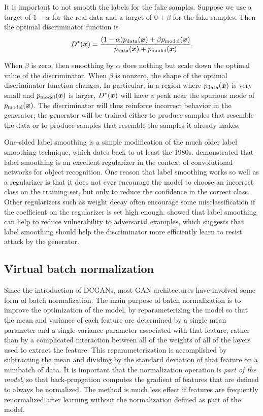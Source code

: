 It is important to not smooth the labels for the fake samples.
Suppose we use a target of $1-\alpha$ for the real data and a target of $0+\beta$
for the fake samples.
Then the optimal discriminator function is
\[ D^*({\bm{x}}) = \frac{(1-\alpha) p_{\rm{data}}({\bm{x}}) + \beta p_{\rm{model}}({\bm{x}})} { p_{\rm{data}}({\bm{x}}) + p_{\rm{model}}({\bm{x}}) }.\]

When $\beta$ is zero, then smoothing by $\alpha$ does nothing but scale down the optimal value
of the discriminator.
When $\beta$ is nonzero, the shape of the optimal discriminator function changes.
In particular, in a region where $p_{\rm{data}}({\bm{x}})$ is very small and $p_{\rm{model}}({\bm{x}})$ is larger,
$D^*({\bm{x}})$ will have a peak near the spurious mode of $p_{\rm{model}}({\bm{x}})$.
The discriminator will thus reinforce incorrect behavior in the generator; the generator
will be trained either to produce samples that resemble the data or to produce samples
that resemble the samples it already makes.

One-sided label smoothing is a simple modification of the much older label smoothing
technique, which dates back to at least the 1980s.
\citet{Szegedy-et-al-2015} demonstrated that label smoothing is an excellent regularizer
in the context of convolutional networks for object recognition.
One reason that label smoothing works so well as a regularizer is that it does not
ever encourage the model to choose an incorrect class on the training set, but only
to reduce the confidence in the correct class.
Other regularizers such as weight decay often encourage some misclassification
if the coefficient on the regularizer is set high enough.
\citet{wardefarley2016} showed that label smoothing can help to reduce vulnerability to
adversarial examples, which suggests that label smoothing should help the discriminator
more efficiently learn to resist attack by the generator.

\subsection{Virtual batch normalization}

Since the introduction of DCGANs, most GAN architectures have involved some form
of batch normalization.
The main purpose of batch normalization is to improve the optimization of the model,
by reparameterizing the model so that the mean and variance of each feature are determined
by a single mean parameter and a single variance parameter associated with that feature,
rather than by a complicated interaction between all of the weights of all of the layers
used to extract the feature.
This reparameterization is accomplished by subtracting the mean and dividing by the standard
deviation of that feature on a minibatch of data.
It is important that the normalization operation is {\em part of the model},
so that back-propgation computes the gradient of features that are defined to always
be normalized.
The method is much less effect if features are frequently renormalized after learning
without the normalization defined as part of the model.

